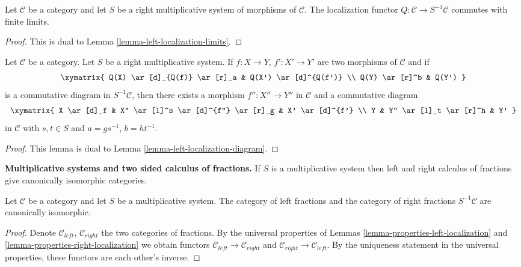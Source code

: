 \begin{lemma}
\label{lemma-right-localization-limits}
Let $\mathcal{C}$ be a category and let $S$ be a right multiplicative
system of morphisms of $\mathcal{C}$. The localization functor
$Q : \mathcal{C} \to S^{-1}\mathcal{C}$ commutes with finite limits.
\end{lemma}

\begin{proof}
This is dual to Lemma \ref{lemma-left-localization-limits}.
\end{proof}

\begin{lemma}
\label{lemma-right-localization-diagram}
Let $\mathcal{C}$ be a category. Let $S$ be a right multiplicative
system. If $f : X \to Y$, $f' : X' \to Y'$ are two morphisms of
$\mathcal{C}$ and if
$$
\xymatrix{
Q(X) \ar[d]_{Q(f)} \ar[r]_a & Q(X') \ar[d]^{Q(f')} \\
Q(Y) \ar[r]^b & Q(Y')
}
$$
is a commutative diagram in $S^{-1}\mathcal{C}$, then there exists
a morphism $f'' : X'' \to Y''$ in $\mathcal{C}$ and a commutative
diagram
$$
\xymatrix{
X \ar[d]_f & X'' \ar[l]^s \ar[d]^{f''} \ar[r]_g & X' \ar[d]^{f'} \\
Y & Y'' \ar[l]_t \ar[r]^h & Y'
}
$$
in $\mathcal{C}$ with $s, t \in S$ and $a = gs^{-1}$, $b = ht^{-1}$.
\end{lemma}

\begin{proof}
This lemma is dual to
Lemma \ref{lemma-left-localization-diagram}.
\end{proof}

\noindent
{\bf Multiplicative systems and two sided calculus of fractions.}
If $S$ is a multiplicative system then left and right calculus of
fractions give canonically isomorphic categories.

\begin{lemma}
\label{lemma-multiplicative-system}
Let $\mathcal{C}$ be a category and let $S$ be a multiplicative system.
The category of left fractions and the category of right fractions
$S^{-1}\mathcal{C}$ are canonically isomorphic.
\end{lemma}

\begin{proof}
Denote $\mathcal{C}_{left}$, $\mathcal{C}_{right}$ the two categories
of fractions. By the universal properties of
Lemmas \ref{lemma-properties-left-localization} and
\ref{lemma-properties-right-localization}
we obtain functors $\mathcal{C}_{left} \to \mathcal{C}_{right}$
and $\mathcal{C}_{right} \to \mathcal{C}_{left}$.
By the uniqueness statement in the universal properties, these
functors are each other's inverse.
\end{proof}


